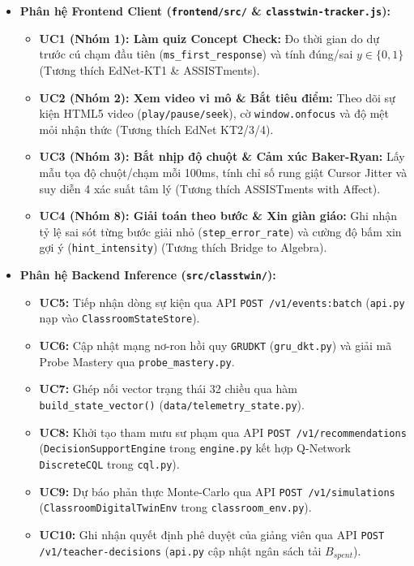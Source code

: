 \documentclass[11pt,a4paper]{article}
\begin{document}
\begin{itemize}
  \item \textbf{Phân hệ Frontend Client (\texttt{frontend/src/} \& \texttt{classtwin-tracker.js}):}
  \begin{itemize}
    \item \textbf{UC1 (Nhóm 1): Làm quiz Concept Check:} Đo thời gian do dự trước cú chạm đầu tiên (\texttt{ms\_first\_response}) và tính đúng/sai $y \in \{0, 1\}$ (Tương thích EdNet-KT1 \& ASSISTments).
    \item \textbf{UC2 (Nhóm 2): Xem video vi mô \& Bắt tiêu điểm:} Theo dõi sự kiện HTML5 video (\texttt{play/pause/seek}), cờ \texttt{window.onfocus} và độ mệt mỏi nhận thức (Tương thích EdNet KT2/3/4).
    \item \textbf{UC3 (Nhóm 3): Bắt nhịp độ chuột \& Cảm xúc Baker-Ryan:} Lấy mẫu tọa độ chuột/chạm mỗi 100ms, tính chỉ số rung giật Cursor Jitter và suy diễn 4 xác suất tâm lý (Tương thích ASSISTments with Affect).
    \item \textbf{UC4 (Nhóm 8): Giải toán theo bước \& Xin giàn giáo:} Ghi nhận tỷ lệ sai sót từng bước giải nhỏ (\texttt{step\_error\_rate}) và cường độ bấm xin gợi ý (\texttt{hint\_intensity}) (Tương thích Bridge to Algebra).
  \end{itemize}
  \item \textbf{Phân hệ Backend Inference (\texttt{src/classtwin/}):}
  \begin{itemize}
    \item \textbf{UC5:} Tiếp nhận dòng sự kiện qua API \texttt{POST /v1/events:batch} (\texttt{api.py} nạp vào \texttt{ClassroomStateStore}).
    \item \textbf{UC6:} Cập nhật mạng nơ-ron hồi quy \texttt{GRUDKT} (\texttt{gru\_dkt.py}) và giải mã Probe Mastery qua \texttt{probe\_mastery.py}.
    \item \textbf{UC7:} Ghép nối vector trạng thái 32 chiều qua hàm \texttt{build\_state\_vector()} (\texttt{data/telemetry\_state.py}).
    \item \textbf{UC8:} Khởi tạo tham mưu sư phạm qua API \texttt{POST /v1/recommendations} (\texttt{DecisionSupportEngine} trong \texttt{engine.py} kết hợp Q-Network \texttt{DiscreteCQL} trong \texttt{cql.py}).
    \item \textbf{UC9:} Dự báo phản thực Monte-Carlo qua API \texttt{POST /v1/simulations} (\texttt{ClassroomDigitalTwinEnv} trong \texttt{classroom\_env.py}).
    \item \textbf{UC10:} Ghi nhận quyết định phê duyệt của giảng viên qua API \texttt{POST /v1/teacher-decisions} (\texttt{api.py} cập nhật ngân sách tải $B_{spent}$).
  \end{itemize}
\end{itemize}
\end{document}

